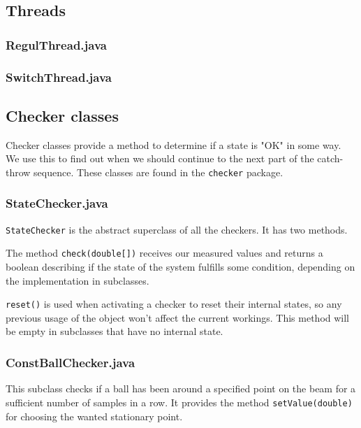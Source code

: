 \subsection{Threads}

\subsubsection{RegulThread.java}

\subsubsection{SwitchThread.java}

\subsection{Checker classes}
Checker classes provide a method to determine if a state is "OK" in some way. We use this to find out when we should continue to the next part of the catch-throw sequence. These classes are found in the \texttt{checker} package.
\subsubsection{StateChecker.java}
\texttt{StateChecker} is the abstract superclass of all the checkers. It has two methods.

The method \texttt{check(double[])} receives our measured values and returns a boolean describing if the state of the system fulfills some condition, depending on the implementation in subclasses.

\texttt{reset()} is used when activating a checker to reset their internal states, so any previous usage of the object won't  affect the current workings. This method will be empty in subclasses that have no internal state.


\subsubsection{ConstBallChecker.java}

This subclass checks if a ball has been around a specified point on the beam for a sufficient number of samples in a row. It provides the method \texttt{setValue(double)} for choosing the wanted stationary point.

